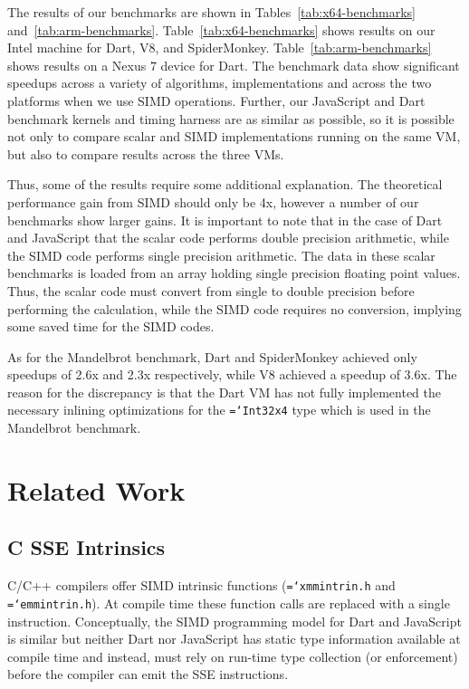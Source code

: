 \documentclass[preprint]{sigplanconf}
\newcommand{\ttt}[1]{{\texttt{\hyphenchar\font=`\-\relax #1}}}%
\begin{document}
The results of our benchmarks are shown in Tables~\ref{tab:x64-benchmarks}
and~\ref{tab:arm-benchmarks}.
%
Table~\ref{tab:x64-benchmarks} shows results on our Intel machine for Dart, V8,
and SpiderMonkey.
%
Table~\ref{tab:arm-benchmarks} shows results on a Nexus 7 device for Dart.
%
The benchmark data show significant speedups across a variety of algorithms,
implementations and across the two platforms when we use SIMD operations.
%
Further, our JavaScript and Dart benchmark kernels and timing harness are as
similar as possible, so it is possible not only to compare scalar and SIMD
implementations running on the same VM, but also to compare results across the
three VMs.


Thus, some of the results require some additional explanation.
%
The theoretical performance gain from SIMD should only be 4x, however a number
of our benchmarks show larger gains.
%
It is important to note that in the case of Dart and JavaScript that the scalar
code performs double precision arithmetic, while the SIMD code
performs single precision arithmetic.
%
The data in these scalar benchmarks is loaded from an array holding single
precision floating point values.
%
Thus, the scalar code must convert from single to double precision before
performing the calculation, while the SIMD code requires no conversion,
implying some saved time for the SIMD codes.


As for the Mandelbrot benchmark, Dart and SpiderMonkey achieved only speedups of
2.6x and 2.3x respectively, while V8 achieved a speedup of 3.6x.
%
The reason for the discrepancy is that the Dart VM has not fully implemented the
necessary inlining optimizations for the \ttt{Int32x4} type which is used in the
Mandelbrot benchmark.


\section{Related Work}

\subsection{C SSE Intrinsics}

C/C++ compilers offer SIMD intrinsic functions (\ttt{xmmintrin.h} and
\ttt{emmintrin.h}). At compile time these function calls are replaced with a
single instruction. Conceptually, the SIMD programming model for Dart and
JavaScript is similar but neither Dart nor JavaScript has static type
information available at compile time and instead, must rely on run-time type
collection (or enforcement) before the compiler can emit the SSE instructions.
\end{document}
